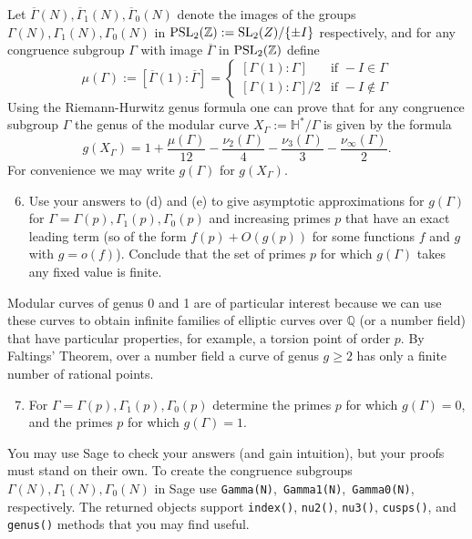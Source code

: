 \documentclass[11pt]{article}
\newcommand{\Q}{\mathbb{Q}}
\renewcommand{\H}{\mathbb{H}}
\newcommand{\Z}{\mathbb{Z}}
\newcommand{\SL}{{\rm SL}}
\newcommand{\PSL}{{\rm PSL}}
\theoremstyle{definition}
\begin{document}
Let $\overline{\Gamma}(N),\overline{\Gamma}_1(N),\overline{\Gamma}_0(N)$ denote the images of the groups $\Gamma(N),\Gamma_1(N),\Gamma_0(N)$ in $\PSL_2(\Z):=\SL_2(Z)/\{\pm I\}$ respectively, and for any congruence subgroup $\Gamma$ with image $\overline{\Gamma}$ in $\PSL_2(\Z)$ define
\[
\mu(\Gamma):=[\overline{\Gamma}(1):\overline{\Gamma}] = \begin{cases}
[\Gamma(1):\Gamma] &\text{if }-I\in \Gamma\\
[\Gamma(1):\Gamma]/2 &\text{if }-I\not\in \Gamma
\end{cases}
\]
Using the Riemann-Hurwitz genus formula one can prove that for any congruence subgroup $\Gamma$ the genus of the modular curve $X_\Gamma:=\H^*/\Gamma$ is given by the formula
\[
g(X_\Gamma) = 1 + \frac{\mu(\Gamma)}{12} - \frac{\nu_2(\Gamma)}{4} - \frac{\nu_3(\Gamma)}{3} - \frac{\nu_\infty(\Gamma)}{2}.
\]
For convenience we may write $g(\Gamma)$ for $g(X_\Gamma)$.

\begin{enumerate}[{\bf(a)}]
\setcounter{enumi}{5}
\item Use your answers to (d) and (e) to give asymptotic approximations for $g(\Gamma)$ for $\Gamma=\Gamma(p),\Gamma_1(p),\Gamma_0(p)$ and increasing primes $p$ that have an exact leading term (so of the form $f(p)+O(g(p))$ for some functions $f$ and $g$ with $g=o(f)$).
Conclude that the set of primes $p$ for which $g(\Gamma)$ takes any fixed value is finite.
\end{enumerate}

Modular curves of genus 0 and 1 are of particular interest because we can use these curves to obtain infinite families of elliptic curves over $\Q$ (or a number field) that have particular properties, for example, a torsion point of order $p$.
By Faltings' Theorem, over a number field a curve of genus $g\ge 2$ has only a finite number of rational points.

\begin{enumerate}[{\bf(a)}]
\setcounter{enumi}{6}
\item For $\Gamma=\Gamma(p),\Gamma_1(p),\Gamma_0(p)$ determine the primes $p$ for which $g(\Gamma)=0$, and the primes $p$ for which $g(\Gamma)=1$.
\end{enumerate}

You may use Sage to check your answers (and gain intuition), but your proofs must stand on their own.  To create the congruence subgroups $\Gamma(N),\Gamma_1(N),\Gamma_0(N)$ in Sage use \texttt{Gamma(N)},\ \texttt{Gamma1(N)},\ \texttt{Gamma0(N)}, respectively.  The returned objects support \texttt{index()}, \texttt{nu2()}, \texttt{nu3()}, \texttt{cusps()}, and \texttt{genus()} methods that you may find useful.
\end{document}
